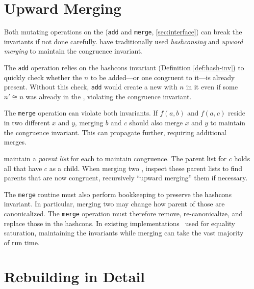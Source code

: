 \section{Upward Merging}
\label{sec:upward}

Both mutating operations on the \egraph
  (\texttt{add} and \texttt{merge}, \autoref{sec:interface})
  can break the \egraph invariants if not done carefully.
\Egraphs have traditionally used \textit{hashconsing} and
  \textit{upward merging} to maintain the congruence invariant.

The \texttt{add} operation relies on the hashcons invariant
  (Definition \ref{def:hash-inv})
  to quickly check whether the \enode $n$ to be added---or one congruent to it---is
  already present.
Without this check, \texttt{add} would create a new \eclass with $n$ in it
  even if some $n' \cong n$ was already in the \egraph,
  violating the congruence invariant.

The \texttt{merge} operation \eclasses can violate both \egraph invariants.
If $f(a, b)$ and $f(a, c)$ reside in two different \eclasses $x$ and $y$,
  merging $b$ and $c$ should also merge $x$ and $y$ to maintain the congruence invariant.
This can propagate further, requiring additional merges.


\Egraphs maintain a \textit{parent list} for each \eclass
  to maintain congruence.
The parent list for \eclass $c$ holds all \enodes that have $c$ as a child.
When merging two \eclasses, \egraphs inspect these parent lists to find parents
  that are now congruent, recursively ``upward merging'' them if necessary.

The \texttt{merge} routine must also perform bookkeeping to preserve the
  hashcons invariant.
In particular, merging two \eclasses may change how parent \enodes of those
  \eclasses are canonicalized.
The \texttt{merge} operation must therefore
  remove, re-canonicalize, and replace those \enodes in the
  hashcons.
In existing \egraph implementations~\cite{herbie} used for equality saturation,
  maintaining the invariants while merging can take the vast majority of
  run time.

\section{Rebuilding in Detail}
\label{sec:rebuilding-detail}

